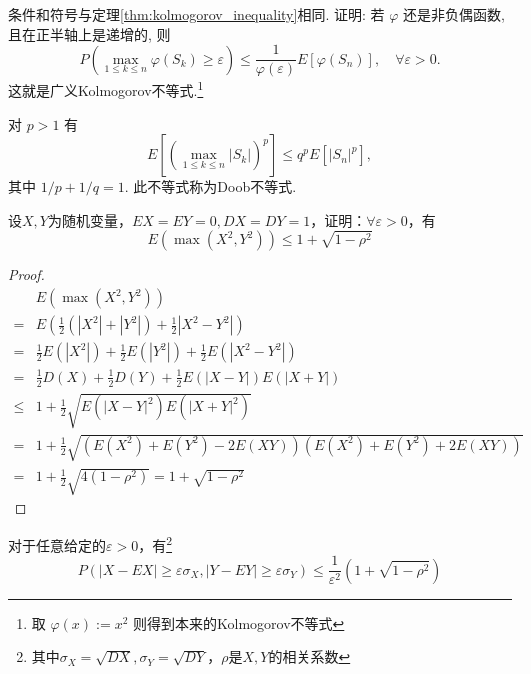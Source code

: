 \begin{theorem}\label{thm:generalized_kolmogorov_inequality}
    条件和符号与定理\ref{thm:kolmogorov_inequality}相同. 证明: 若 $\varphi$ 还是非负偶函数, 且在正半轴上是递增的, 则
    $$
        P\left(\max _{1 \leqslant k \leqslant n} \varphi\left(S_k\right) \geqslant \varepsilon\right) \leqslant \frac{1}{\varphi(\varepsilon)} E\left[\varphi\left(S_n\right)\right], \quad \forall \varepsilon>0 .
    $$
    这就是广义Kolmogorov不等式.\footnote{取 $\varphi(x):=x^2$ 则得到本来的Kolmogorov不等式}
\end{theorem}
\begin{theorem}[Doob不等式]
    对 $p>1$ 有
    $$
        E\left[\left(\max _{1 \leqslant k \leqslant n}\left|S_k\right|\right)^p\right] \leqslant q^p E\left[\left|S_n\right|^p\right],
    $$
    其中 $1 / p+1 / q=1$. 此不等式称为Doob不等式.
\end{theorem}
\begin{exercise}\label{ex:1}
    设$X,Y$为随机变量，$EX=EY=0,DX=DY=1$，证明：$\forall \varepsilon>0$，有
    \[
        E(\max(X^2,Y^2))\le 1+\sqrt{1-\rho^2}
    \]
\end{exercise}
\begin{proof}
    \begin{align*}
            & E(\max(X^2,Y^2))                                                 \\
        =   & E\left(\frac{1}{2}(|X^2|+|Y^2|)+\frac{1}{2}|X^2-Y^2|\right)      \\
        =   & \frac{1}{2}E(|X^2|)+\frac{1}{2}E(|Y^2|)+\frac{1}{2}E(|X^2-Y^2|)  \\
        =   & \frac{1}{2}D(X)+\frac{1}{2}D(Y)+\frac{1}{2}E(|X-Y|)E(|X+Y|)      \\
        \le & 1+\frac{1}{2}\sqrt{E(|X-Y|^2)E(|X+Y|^2)}                         \\
        =   & 1+\frac{1}{2}\sqrt{(E(X^2)+E(Y^2)-2E(XY))(E(X^2)+E(Y^2)+2E(XY))} \\
        =   & 1+\frac{1}{2}\sqrt{4(1-\rho^2)}=1+\sqrt{1-\rho^2}
    \end{align*}
\end{proof}
\begin{corollary}
    对于任意给定的$\varepsilon>0$，有\footnote{其中$\sigma_X=\sqrt{DX},\sigma_Y=\sqrt{DY}$，$\rho$是$X,Y$的相关系数}
    \[
        P(|X-EX|\ge \varepsilon\sigma_X,|Y-EY|\ge \varepsilon\sigma_Y)\le \frac{1}{\varepsilon^2}(1+\sqrt{1-\rho^2})
    \]
\end{corollary}

